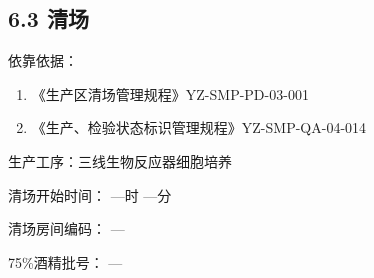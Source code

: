 \documentclass[UTF8,10pt,a4paper,fontset=fandol]{ctexart}
\newcommand{\fieldvalue}[1]{#1}
\newcommand{\handwritten}[1]{#1}
\begin{document}
\subsection*{6.3 清场}

\noindent
依靠依据：

\begin{enumerate}
    \item 《生产区清场管理规程》\hfill YZ-SMP-PD-03-001
    \item 《生产、检验状态标识管理规程》\hfill YZ-SMP-QA-04-014
\end{enumerate}

\noindent
生产工序：三线生物反应器细胞培养

\noindent
清场开始时间：
\quad
\fieldvalue{\handwritten{—}}时
\quad
\fieldvalue{\handwritten{—}}分

\noindent
清场房间编码：
\fieldvalue{\handwritten{—}}

\hfill
75\%酒精批号：
\fieldvalue{\handwritten{—}}

\vspace{2mm}
\end{document}
